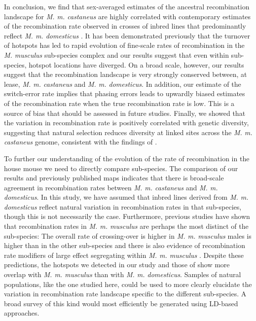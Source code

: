 In conclusion, we find that sex-averaged estimates of the ancestral recombination landscape for \emph{M. m. castaneus} are highly correlated with contemporary estimates of the recombination rate observed in crosses of inbred lines that predominantly reflect \emph{M. m. domesticus} \citep{RN232}. It has been demonstrated previously that the turnover of hotspots has led to rapid evolution of fine-scale rates of recombination in the \emph{M. musculus} sub-species complex \citep{RN249} and our results suggest that even within sub-species, hotspot locations have diverged. On a broad scale, however, our results suggest that the recombination landscape is very strongly conserved between, at lease, \emph{M. m. castaneus} and \emph{M. m. domesticus}. In addition, our estimate of the switch-error rate implies that phasing errors leads to upwardly biased estimates of the recombination rate when the true recombination rate is low. This is a source of bias that should be assessed in future studies. Finally, we showed that the variation in recombination rate is positively correlated with genetic diversity, suggesting that natural selection reduces diversity at linked sites across the \emph{M. m. castaneus} genome, consistent with the findings of \cite{RN122}. 
 
To further our understanding of the evolution of the rate of recombination in the house mouse we need to directly compare sub-species. The comparison of our results and previously published maps indicates that there is broad-scale agreement in recombination rates between \emph{M. m. castaneus} and \emph{M. m. domesticus}. In this study, we have assumed that inbred lines derived from \emph{M. m. domesticus} reflect natural variation in recombination rates in that sub-species, though this is not necessarily the case.  Furthermore, previous studies have shown that recombination rates in \emph{M. m. musculus} are perhaps the most distinct of the sub-species: The overall rate of crossing-over is higher in \emph{M. m. musculus} males is higher than in the other sub-species \citep{RN270} and there is also evidence of recombination rate modifiers of large effect segregating within \emph{M. m. musculus} \citep{RN244}. Despite these predictions, the hotspots we detected in our study and those of \cite{RN249} show more overlap with \emph{M. m. musculus} than with \emph{M. m. domesticus}. Samples of natural populations, like the one studied here, could be used to more clearly elucidate the variation in recombination rate landscape specific to the different sub-species. A broad survey of this kind would most efficiently be generated using LD-based approaches.  
